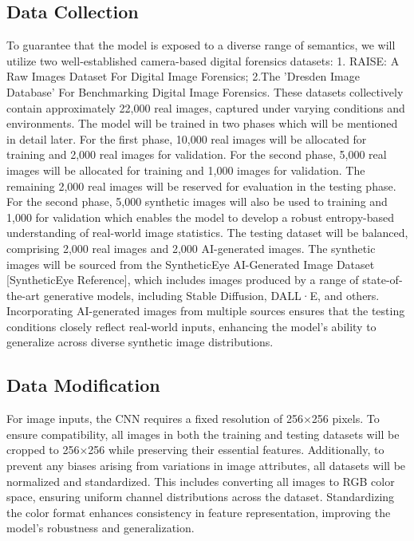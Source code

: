 \documentclass{article} %
\begin{document}
\subsection{Data Collection}
To guarantee that the model is exposed to a diverse range of semantics, we will utilize two well-established camera-based digital forensics datasets: 1. RAISE: A Raw Images Dataset For Digital Image Forensics; 2.The 'Dresden Image Database' For Benchmarking Digital Image Forensics. These datasets collectively contain approximately 22,000 real images, captured under varying conditions and environments. The model will be trained in two phases which will be mentioned in detail later. For the first phase, 10,000 real images will be allocated for training and 2,000 real images for validation. For the second phase, 5,000 real images will be allocated for training and 1,000 images for validation. The remaining 2,000 real images will be reserved for evaluation in the testing phase. For the second phase, 5,000 synthetic images will also be used to training and 1,000 for validation which enables the model to develop a robust entropy-based understanding of real-world image statistics.
The testing dataset will be balanced, comprising 2,000 real images and 2,000 AI-generated images. The synthetic images will be sourced from the SyntheticEye AI-Generated Image Dataset [SyntheticEye Reference], which includes images produced by a range of state-of-the-art generative models, including Stable Diffusion, DALL·E, and others. Incorporating AI-generated images from multiple sources ensures that the testing conditions closely reflect real-world inputs, enhancing the model's ability to generalize across diverse synthetic image distributions.

\subsection{Data Modification}
For image inputs, the CNN requires a fixed resolution of 256×256 pixels. To ensure compatibility, all images in both the training and testing datasets will be cropped to 256×256 while preserving their essential features.
Additionally, to prevent any biases arising from variations in image attributes, all datasets will be normalized and standardized. This includes converting all images to RGB color space, ensuring uniform channel distributions across the dataset. Standardizing the color format enhances consistency in feature representation, improving the model's robustness and generalization.
\end{document}
